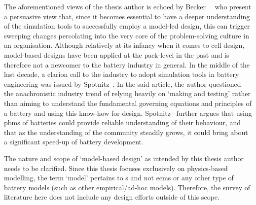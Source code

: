 The   aforementioned    views   of    the   thesis    author   is    echoed   by
Becker~\etal~\cite{Becker2005}  who  present  a   persuasive  view  that,  since
it  becomes  essential  to  have   a  deeper  understanding  of  the  simulation
tools  to successfully  employ a  model-led  design, this  can trigger  sweeping
changes percolating  into the  very core  of the  problem-solving culture  in an
organisation. Although relatively  at its infancy when it comes  to cell design,
model-based  designs have  been applied  at the  pack-level in  the past  and is
therefore not a  newcomer to the battery  industry in general. In  the middle of
the last  decade, a clarion  call to the industry  to adopt simulation  tools in
battery  engineering was  issued  by Spotnitz~\cite{Spotnitz2005}.  In the  said
article,  the author  questioned  the anachronistic  industry  trend of  relying
heavily on `making and testing' rather than aiming to understand the fundamental
governing equations  and principles  of a  battery and  using this  know-how for
design. Spotnitz~\cite{Spotnitz2005}  further argues  that using  \glspl{pbm} of
batteries could provide  reliable understanding of their behaviour,  and that as
the  understanding of  the  community steadily  grows, it  could  bring about  a
significant speed-up of battery development.

The nature and  scope of `model-based design' as intended  by this thesis author
needs to  be clarified. Since  this thesis focuses exclusively  on physics-based
modelling, the term  `model' pertains to s and  not \glspl{ecm} or
any  other type  of  battery  models (such  as  other empirical/ad-hoc  models).
Therefore, the  survey of literature  here does  not include any  design efforts
outside of this scope.

